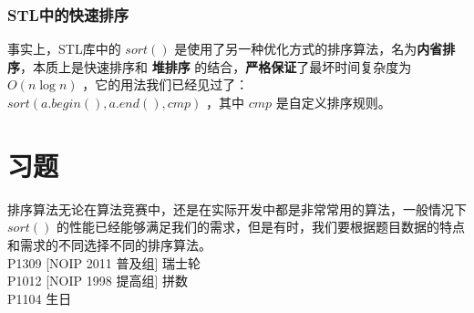 \documentclass{beamer}
\newcommand{\fdf}[1]{\alert{\textbf{#1}}}
\begin{document}
\begin{frame}
\frametitle{STL中的快速排序}
事实上，STL库中的 $sort()$ 是使用了另一种优化方式的排序算法，名为\fdf{内省排序}，本质上是快速排序和 \fdf{堆排序} 的结合，\fdf{严格保证}了最坏时间复杂度为 $O(n\log n)$ ，它的用法我们已经见过了：\\ 
$sort(a.begin(), a.end(), cmp)$ ，其中 $cmp$ 是自定义排序规则。
\end{frame}
\section{习题}
\begin{frame}
排序算法无论在算法竞赛中，还是在实际开发中都是非常常用的算法，一般情况下 $sort()$ 的性能已经能够满足我们的需求，但是有时，我们要根据题目数据的特点和需求的不同选择不同的排序算法。\\
P1309 [NOIP 2011 普及组] 瑞士轮\\
P1012 [NOIP 1998 提高组] 拼数 \\
P1104 生日\\
\end{frame}
\end{document}

